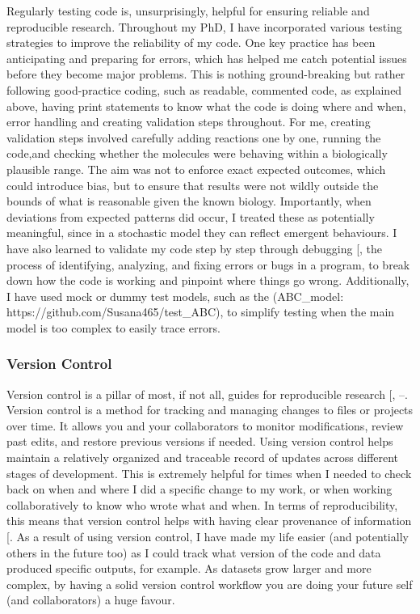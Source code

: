 \documentclass[
  11pt,
  letterpaper,
]{scrreprt}
\begin{document}
Regularly testing code is, unsurprisingly, helpful for ensuring reliable
and reproducible research. Throughout my PhD, I have incorporated
various testing strategies to improve the reliability of my code. One
key practice has been anticipating and preparing for errors, which has
helped me catch potential issues before they become major problems. This
is nothing ground-breaking but rather following good-practice coding,
such as readable, commented code, as explained above, having print
statements to know what the code is doing where and when, error handling
and creating validation steps throughout. For me, creating validation
steps involved carefully adding reactions one by one, running the
code,and checking whether the molecules were behaving within a
biologically plausible range. The aim was not to enforce exact expected
outcomes, which could introduce bias, but to ensure that results were
not wildly outside the bounds of what is reasonable given the known
biology. Importantly, when deviations from expected patterns did occur,
I treated these as potentially meaningful, since in a stochastic model
they can reflect emergent behaviours. I have also learned to validate my
code step by step through debugging
{[}\citeproc{ref-mccauley2008Debugging}{387}{]}, the process of
identifying, analyzing, and fixing errors or bugs in a program, to break
down how the code is working and pinpoint where things go wrong.
Additionally, I have used mock or dummy test models, such as the
(ABC\_model: https://github.com/Susana465/test\_ABC), to simplify
testing when the main model is too complex to easily trace errors.

\subsubsection*{Version Control}\label{version-control}

Version control is a pillar of most, if not all, guides for reproducible
research {[},
--\citeproc{ref-hamra2025Advancing}{392}{]}.
Version control is a method for tracking and managing changes to files
or projects over time. It allows you and your collaborators to monitor
modifications, review past edits, and restore previous versions if
needed. Using version control helps maintain a relatively organized and
traceable record of updates across different stages of development. This
is extremely helpful for times when I needed to check back on when and
where I did a specific change to my work, or when working
collaboratively to know who wrote what and when. In terms of
reproducibility, this means that version control helps with having clear
provenance of information {[}\citeproc{ref-hamra2025Advancing}{392}{]}.
As a result of using version control, I have made my life easier (and
potentially others in the future too) as I could track what version of
the code and data produced specific outputs, for example. As datasets
grow larger and more complex, by having a solid version control workflow
you are doing your future self (and collaborators) a huge favour.
\end{document}
